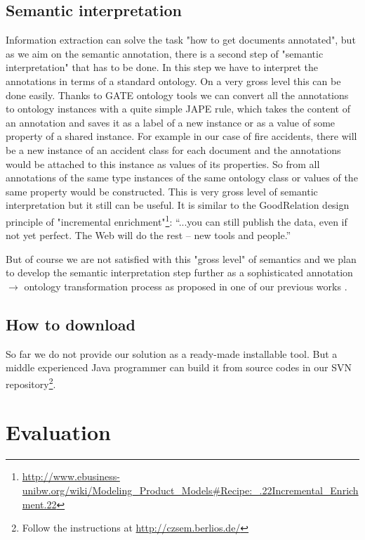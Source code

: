 \documentclass[runningheads,a4paper]{llncs}
\begin{document}
\subsection{Semantic interpretation}
\label{sec:SemanticInterpretation}
Information extraction can solve the task "how to get documents annotated", but as we aim on the semantic annotation, there is a second step of "semantic interpretation" that has to be done. In this step we have to interpret the annotations in terms of a standard ontology. On a very gross level this can be done easily. Thanks to GATE ontology tools we can convert all the annotations to ontology instances with a quite simple JAPE \cite{Cunningham00jape:a} rule, which takes the content of an annotation and saves it as a label of a new instance or as a value of some property of a shared instance. For example in our case of fire accidents, there will be a new instance of an accident class for each document and the annotations would be attached to this instance as values of its properties. So from all annotations of the same type instances of the same ontology class or values of the same property would be constructed. This is very gross level of semantic interpretation but it still can be useful. It is similar to the GoodRelation \cite{DBLP:conf/ekaw/Hepp08} design principle of "incremental enrichment"\footnote{\url{http://www.ebusiness-unibw.org/wiki/Modeling_Product_Models#Recipe:_.22Incremental_Enrichment.22}}:
``...you can still publish the data, even if not yet perfect. The Web will do the rest -- new tools and people.''	

But of course we are not satisfied with this "gross level" of semantics and we plan to develop the semantic interpretation step further as a sophisticated annotation $\rightarrow$ ontology transformation process as proposed in one of our previous works \cite{biblio:DeVoComputingaggregations2008}.

\subsection{How to download}
So far we do not provide our solution as a ready-made installable tool. But a middle experienced Java programmer can build it from source codes in our SVN repository\footnote{Follow the instructions at \url{http://czsem.berlios.de/}}.




\section{Evaluation}
\label{sec:evaluation}
\end{document}
